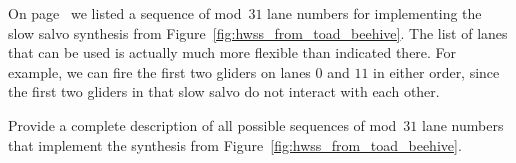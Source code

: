 \begin{multicols}{2}

\mfilbreak


\begin{problem}\label{exer:silverfish_list_of_lanes}
	On page~\pageref{page:silverfish_lanes} we listed a sequence of mod~$31$ lane numbers for implementing the slow salvo synthesis from Figure~\ref{fig:hwss_from_toad_beehive}. The list of lanes that can be used is actually much more flexible than indicated there. For example, we can fire the first two gliders on lanes $0$ and $11$ in either order, since the first two gliders in that slow salvo do not interact with each other.
	
	Provide a complete description of all possible sequences of mod~$31$ lane numbers that implement the synthesis from Figure~\ref{fig:hwss_from_toad_beehive}.
\end{problem}

\end{multicols}
\normalsize\vspace*{0.01cm}

